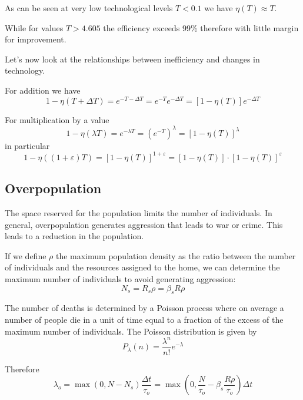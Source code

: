 \documentclass[a4paper,twoside]{article}
\begin{document}
As can be seen at very low technological levels $ T < 0.1 $ we have $ \eta(T) \approx T $.

While for values $ T > 4.605 $ the efficiency exceeds 99\% therefore with little margin for improvement.

Let's now look at the relationships between inefficiency and changes in technology.

For addition we have
\begin{equation*}
	1 - \eta(T + \Delta T)
	= e^{-T - \Delta T}
	= e^{-T} e^{-\Delta T}
	= [1 - \eta(T)] e^{-\Delta T}
\end{equation*}

For multiplication by a value
\begin{equation*}
	1 - \eta(\lambda T)
	= e^{-\lambda T}
	= (e^{-T})^\lambda
	= [1 - \eta(T)] ^{\lambda}
\end{equation*}
in particular
\begin{equation*}
	1 - \eta((1 +\varepsilon) T)
	= [1 - \eta(T)] ^{1 + \varepsilon}
	= [1 - \eta(T)] \cdot [1 - \eta(T)]^{\varepsilon}
\end{equation*}

\subsection{Overpopulation}

The space reserved for the population limits the number of individuals.
In general, overpopulation generates aggression that leads to war or crime. This leads to a reduction in the population.

If we define $ \rho $ the maximum population density as the ratio between the number of individuals and the resources assigned to the home, we can determine the maximum number of individuals to avoid generating aggression:
\begin{equation}\label{eq:Ns}
	N_s = R_s \rho = \beta_s R \rho
\end{equation}

The number of deaths is determined by a Poisson process where on average a number of people die in a unit of time equal to a fraction of the excess of the maximum number of individuals.
The Poisson distribution is given by
\begin{equation}\label{eq:poisson}
	P_\lambda(n) = \frac{\lambda ^{n}}{n!}e^{-\lambda }
\end{equation}

Therefore
\begin{equation}\label{eq:overPop}
	\lambda_o = \max(0, N - N_s) \frac{\Delta t}{\tau_o}
	= \max \left( 0, \frac{N}{\tau_o} - \beta_s \frac{R \rho}{\tau_o} \right) \Delta t
\end{equation}
\end{document}
